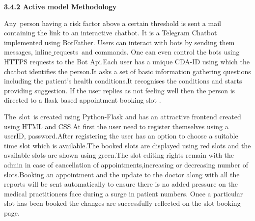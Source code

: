 \documentclass[12pt]{article}
\begin{document}
\begin{justify}
{\fontsize{14pt}{16.8pt}\selectfont \textbf{3.4.2 Active model Methodology}}
\end{justify}
\vspace{\baselineskip}
\begin{justify}
Any\ person having a risk factor above a certain threshold is sent a mail containing the link to an interactive chatbot. It is a Telegram Chatbot  implemented using BotFather. Users can interact with bots by sending them messages, inline\href{https://core.telegram.org/bots#inline-mode}{ }requests\ and commands. One can even control the bots using HTTPS requests to the  Bot Api.Each user has a unique CDA-ID using which the chatbot identifies the person.It asks a set of basic information gathering questions including the patient's health conditions.It recognises the conditions and starts providing suggestion. If the user replies as not feeling well then the person is directed to a flask based appointment booking slot .
\end{justify}

\vspace{\baselineskip}
\setlength{\parskip}{9.96pt}
\setlength{\parskip}{0.0pt}
\begin{justify}
The\ slot\ is created using  Python-Flask and has an attractive frontend created using HTML and CSS.At first the user need to register themselves using a userID, password.After registering the  user has an option to choose a suitable time slot which is available.The booked slots are displayed using red slots and the available slots are shown using green.The slot editing rights remain with the admin in case of cancellation of appointments,increasing or decreasing number of slots.Booking an appointment and the update to the doctor along with all the reports will be sent automatically to ensure there is no added pressure on the medical practitioners face during a surge in patient numbers. Once a particular slot has been booked the changes are successfully reflected on the slot booking page.
\end{justify}

\vspace{\baselineskip}
\setlength{\parskip}{9.96pt}

\vspace{\baselineskip}
\setlength{\parskip}{0.0pt}
\setlength{\parskip}{9.96pt}

\vspace{\baselineskip}
\setlength{\parskip}{0.0pt}
\setlength{\parskip}{9.96pt}
\end{document}

